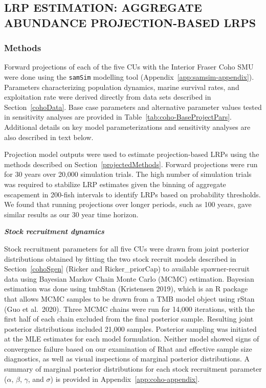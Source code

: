 \documentclass[11pt]{book}
\begin{document}
\hypertarget{lrp-estimation-aggregate-abundance-projection-based-lrps}{%
\subsection{LRP ESTIMATION: AGGREGATE ABUNDANCE PROJECTION-BASED LRPS}\label{lrp-estimation-aggregate-abundance-projection-based-lrps}}

\hypertarget{methods-1}{%
\subsubsection{Methods}\label{methods-1}}

Forward projections of each of the five CUs with the Interior Fraser Coho SMU were done using the \texttt{samSim} modelling tool (Appendix~\ref{app:samsim-appendix}). Parameters characterizing population dynamics, marine survival rates, and exploitation rate were derived directly from data sets described in Section~\ref{cohoData}. Base case parameters and alternative parameter values tested in sensitivity analyses are provided in Table~\ref{tab:coho-BaseProjectPars}. Additional details on key model parameterizations and sensitivity analyses are also described in text below.

Projection model outputs were used to estimate projection-based LRPs using the methods described on Section~\ref{projectedMethods}. Forward projections were run for 30 years over 20,000 simulation trials. The high number of simulation trials was required to stabilize LRP estimates given the binning of aggregate escapement in 200-fish intervals to identify LRPs based on probability thresholds. We found that running projections over longer periods, such as 100 years, gave similar results as our 30 year time horizon.

\textbf{\emph{Stock recruitment dynamics}}

Stock recruitment parameters for all five CUs were drawn from joint posterior distributions obtained by fitting the two stock recruit models described in Section~\ref{cohoSgen} (Ricker and Ricker\_priorCap) to available spawner-recruit data using Bayesian Markov Chain Monte Carlo (MCMC) estimation. Bayesian estimation was done using tmbStan (Kristensen 2019), which is an R package that allows MCMC samples to be drawn from a TMB model object using rStan (Guo et al.~2020). Three MCMC chains were run for 14,000 iterations, with the first half of each chain excluded from the final posterior sample. Resulting joint posterior distributions included 21,000 samples. Posterior sampling was initiated at the MLE estimates for each model formulation. Neither model showed signs of convergence failure based on our examination of Rhat and effective sample size diagnostics, as well as visual inspections of marginal posterior distributions. A summary of marginal posterior distributions for each stock recruitment parameter (\(\alpha\), \(\beta\), \(\gamma\), and \(\sigma\)) is provided in Appendix~\ref{app:coho-appendix}.
\end{document}
